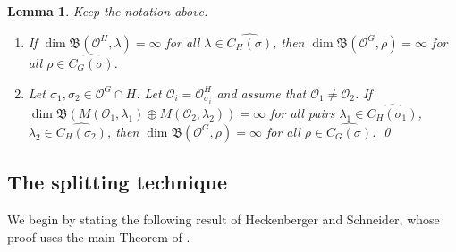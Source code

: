 \documentclass[11pt]{amsart} \textheight 22cm
\newcommand{\supp}{\operatorname{supp}}
\renewcommand{\^}[1]{\mbox{$^{\left( #1 \right)}$}}
\renewcommand{\_}[1]{\mbox{$_{\left( #1 \right)}$}}
\newcommand\toba{{\mathfrak B }}
\newcommand{\ku}{\mathbb C}
\newcommand{\Hc}{{\mathcal H}}
\newcommand{\oc}{{\mathcal O}}
\newcommand{\ydh}{{}^{\Hc}_{\Hc}\mathcal{YD}}
\newcommand{\ydg}{{}^{\ku G}_{\ku G}\mathcal{YD}}
\theoremstyle{plain}
\newtheorem{lema}{Lemma}[section]
\theoremstyle{definition}
\theoremstyle{remark}
\theoremstyle{remark}
\begin{document}
\begin{lema}\label{lem:subgrupo_general} Keep the notation above.
    \renewcommand{\theenumi}{\roman{enumi}}   \renewcommand{\labelenumi}{(\theenumi)}
    \begin{enumerate}
        \item\label{item:subgpo1}
            If $\dim \toba(\oc^H,\lambda)=\infty$ for all
            $\lambda\in\widehat{C_{H}(\sigma)}$, then $\dim\toba(\oc^G,\rho)=\infty$ for all
            $\rho\in \widehat{C_{G}(\sigma)}$.

        \medbreak
        \item\label{item:subgpo3}
            Let $\sigma_1,\sigma_2\in\oc^G\cap H$. Let
            $\mathcal{O}_i=\mathcal{O}_{\sigma_i}^H$ and
            assume that $\mathcal{O}_1\ne\mathcal{O}_2$. If
            $\dim\mathfrak{B}(M(\mathcal{O}_{1},\lambda_{1})\oplus
            M(\mathcal{O}_{2},\lambda_{2}))=\infty$ for all
            pairs $\lambda_1\in\widehat{C_H(\sigma_1)}$,
            $\lambda_2\in\widehat{C_H(\sigma_2)}$, then
            $\dim\mathfrak{B}(\mathcal{O}^{G},\rho)=\infty$
            for all $\rho\in \widehat{C_{G}(\sigma)}$. \qed

    \end{enumerate}
\end{lema}



\medbreak\subsection{The splitting
technique}\label{sect:splitconj} We begin by stating the following
result of Heckenberger and Schneider, whose proof uses the main
Theorem of \cite{AHS}.
\end{document}
